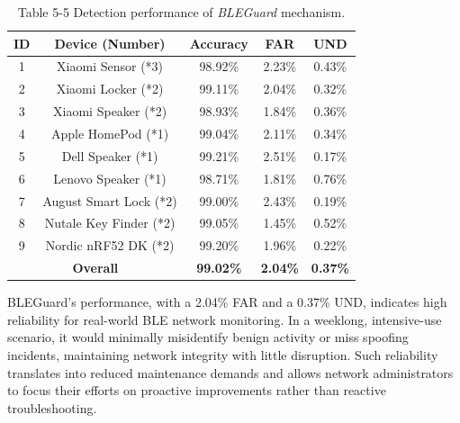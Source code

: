 \begin{table}[H]
\centering
\tabcolsep=0.60cm
\renewcommand\arraystretch{1.16}
\caption*{Table 5-5 Detection performance of \textit{BLEGuard} mechanism.}
\vspace{-4pt}
\begin{tabular}{c|c|c|c|c}
\bottomrule[1pt]
\textbf{ID} & \textbf{Device (Number)}  & \textbf{Accuracy} & \textbf{FAR}  & \textbf{UND} \\ \hline \hline
 1 & Xiaomi Sensor (*3)     &   98.92\%         &    2.23\%         &    0.43\%         \\ \hline
 2 & Xiaomi Locker (*2)     &   99.11\%         &    2.04\%         &    0.32\%         \\ \hline
 3 & Xiaomi Speaker (*2)    &   98.93\%         &    1.84\%         &    0.36\%         \\ \hline
 4 & Apple HomePod (*1)     &   99.04\%         &    2.11\%         &    0.34\%         \\ \hline
 5 & Dell Speaker (*1)      &   99.21\%         &    2.51\%         &    0.17\%         \\ \hline
 6 & Lenovo Speaker (*1)    &   98.71\%         &    1.81\%         &    0.76\%         \\ \hline
 7 & August Smart Lock (*2) &   99.00\%         &    2.43\%         &    0.19\%         \\ \hline
 8 & Nutale Key Finder (*2) &   99.05\%         &    1.45\%         &    0.52\%         \\ \hline
 9 & Nordic nRF52 DK (*2)   &   99.20\%         &    1.96\%         &    0.22\%         \\ \hline \hline
\multicolumn{2}{c|}{\textbf{Overall}}   & \textbf{99.02\%}  &  \textbf{2.04\%}  & \textbf{0.37\%}   \\
\toprule[1pt]
\end{tabular}
\end{table}

\noindent BLEGuard's performance, with a 2.04\% FAR and a 0.37\% UND, indicates high reliability for real-world BLE network monitoring. In a weeklong, intensive-use scenario, it would minimally misidentify benign activity or miss spoofing incidents, maintaining network integrity with little disruption. Such reliability translates into reduced maintenance demands and allows network administrators to focus their efforts on proactive improvements rather than reactive troubleshooting.




